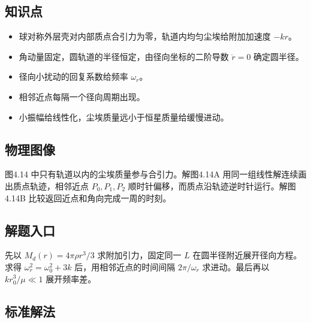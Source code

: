 \documentclass[UTF8,fontset=fandol,a4paper,11pt]{ctexart}
\begin{document}

\subsection*{知识点}

\begin{itemize}
\item 球对称外层壳对内部质点合引力为零，轨道内均匀尘埃给附加加速度 $-kr$。
\item 角动量固定，圆轨道的半径恒定，由径向坐标的二阶导数 $\ddot r=0$ 确定圆半径。
\item 径向小扰动的回复系数给频率 $\omega_r$。
\item 相邻近点每隔一个径向周期出现。
\item 小振幅给线性化，尘埃质量远小于恒星质量给缓慢进动。
\end{itemize}




\subsection*{物理图像}

图4.14 中只有轨道以内的尘埃质量参与合引力。解图4.14A 用同一组线性解连续画出质点轨迹，相邻近点 $P_0,P_1,P_2$ 顺时针偏移，而质点沿轨迹逆时针运行。解图4.14B 比较返回近点和角向完成一周的时刻。



\subsection*{解题入口}

先以 $M_d(r)=4\pi\rho r^3/3$ 求附加引力，固定同一 $L$ 在圆半径附近展开径向方程。求得 $\omega_r^2=\omega_0^2+3k$ 后，用相邻近点的时间间隔 $2\pi/\omega_r$ 求进动。最后再以 $kr_0^3/\mu\ll1$ 展开频率差。



\subsection*{标准解法}
\end{document}
